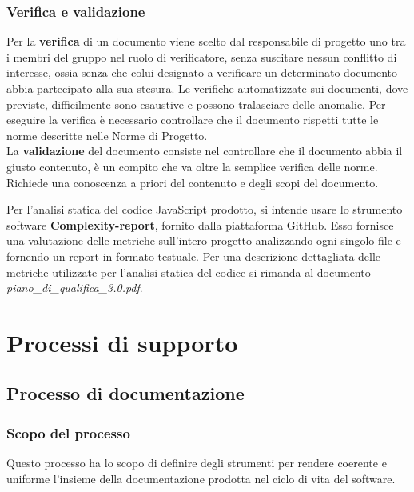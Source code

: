 \documentclass[a4paper,11pt]{article}
\begin{document}
	\subsubsection{Verifica e validazione}
	Per la \textbf{verifica} di un documento viene scelto dal responsabile di progetto uno tra i membri del gruppo nel ruolo di verificatore, senza suscitare nessun conflitto di interesse, ossia senza che colui designato a verificare un determinato documento abbia partecipato alla sua stesura.
	 Le verifiche automatizzate sui documenti, dove previste, difficilmente sono esaustive e possono tralasciare delle anomalie. Per eseguire la verifica è necessario controllare che il documento rispetti tutte le norme descritte nelle Norme di Progetto. \\
	La \textbf{validazione} del documento consiste nel controllare che il documento abbia il giusto contenuto, è un compito che va oltre la semplice verifica delle norme. Richiede una conoscenza a priori del contenuto e degli scopi del documento.

Per l'analisi statica del codice JavaScript prodotto, si intende usare lo strumento software \textbf{Complexity-report\addglos}, fornito dalla piattaforma GitHub.
Esso fornisce una valutazione delle metriche sull'intero progetto analizzando ogni singolo file e fornendo un report in formato testuale.
Per una descrizione dettagliata delle metriche utilizzate per l'analisi statica del codice si rimanda al documento \textit{piano\_di\_qualifica\_3.0.pdf}.
		
	\section{Processi di supporto}
		\subsection{Processo di documentazione}
		
			\subsubsection{Scopo del processo}
			Questo processo ha lo scopo di definire degli strumenti per rendere coerente e uniforme l'insieme della documentazione prodotta nel ciclo di vita del software.
			
\end{document}
